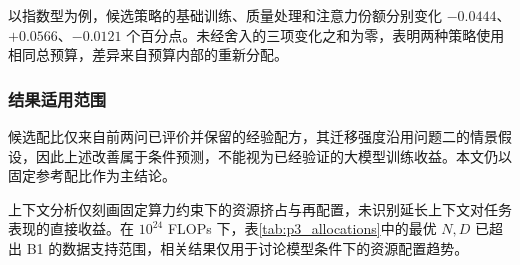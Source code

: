 \documentclass[bwprint]{gmcmthesis}
\numberwithin{equation}{section}
\numberwithin{figure}{section}
\numberwithin{table}{section}
\begin{document}
        以指数型为例，候选策略的基础训练、质量处理和注意力份额分别变化 $-0.0444$、$+0.0566$、$-0.0121$ 个百分点。未经舍入的三项变化之和为零，表明两种策略使用相同总预算，差异来自预算内部的重新分配。

        \subsubsection{结果适用范围}

        候选配比仅来自前两问已评价并保留的经验配方，其迁移强度沿用问题二的情景假设，因此上述改善属于条件预测，不能视为已经验证的大模型训练收益。本文仍以固定参考配比作为主结论。

        上下文分析仅刻画固定算力约束下的资源挤占与再配置，未识别延长上下文对任务表现的直接收益。在 $10^{24}$ FLOPs 下，表\ref{tab:p3_allocations}中的最优 $N,D$ 已超出 B1 的数据支持范围，相关结果仅用于讨论模型条件下的资源配置趋势。




\end{document}
